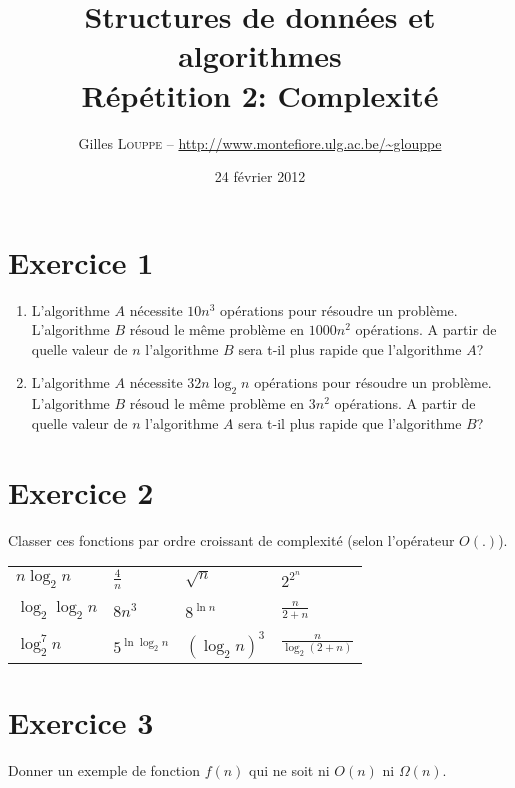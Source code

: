 \documentclass[a4paper,10pt]{article}
\title{
    \textbf{Structures de données et algorithmes}\\
    Répétition 2: Complexité
}
\author{Gilles \textsc{Louppe} -- \url{http://www.montefiore.ulg.ac.be/~glouppe}}
\date{24 février 2012}
\begin{document}
\maketitle

\section*{Exercice 1}

\begin{enumerate}

\item L'algorithme $A$ nécessite $10n^3$ opérations pour résoudre un problème.
L'algorithme $B$ résoud le même problème en $1000n^2$ opérations. A partir de
quelle valeur de $n$ l'algorithme $B$ sera t-il plus rapide que l'algorithme
$A$?

\item L'algorithme $A$ nécessite $32n \log_2 n$ opérations pour résoudre un
problème.  L'algorithme $B$ résoud le même problème en $3n^2$ opérations. A
partir de quelle valeur de $n$  l'algorithme $A$ sera t-il plus rapide que
l'algorithme $B$?

\end{enumerate}

\section*{Exercice 2}

Classer ces fonctions par ordre croissant de complexité (selon l'opérateur
$O(.)$).

\begin{center}
\begin{tabular}{llll}
    $n \log_2 n$ & $\frac{4}{n}$ & $\sqrt{n}$ & $2^{2^n}$ \\\\
    $\log_2 \log_2 n$ & $8n^3$ & $8^{\ln n}$ & $\frac{n}{2+n}$ \\\\
    $\log_2^7 n$ & $5^{\ln \log_2 n}$ & $(\log_2 n)^3$ & $\frac{n}{\log_2 (2+n)}$
\end{tabular}
\end{center}

\section*{Exercice 3}

Donner un exemple de fonction $f(n)$ qui ne soit ni $O(n)$ ni $\Omega(n)$.
\end{document}
